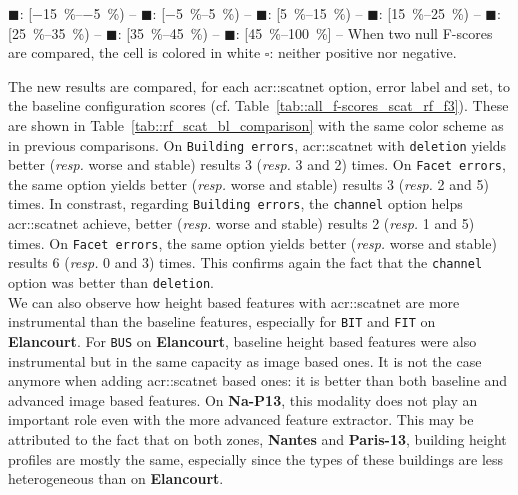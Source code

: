 \begin{table}[htbp]
{                    \textcolor{LOSS0515}{\(\blacksquare\)}: [\SIrange[range-phrase={, }]{-15}{-5}{\percent}) --
                    \textcolor{STBL}{\(\blacksquare\)}: [\SIrange[range-phrase={, }]{-5}{5}{\percent}) --
                    \textcolor{GAIN0515}{\(\blacksquare\)}: [\SIrange[range-phrase={, }]{5}{15}{\percent}) --
                    \textcolor{GAIN1525}{\(\blacksquare\)}: [\SIrange[range-phrase={, }]{15}{25}{\percent}) --
                    \textcolor{GAIN2535}{\(\blacksquare\)}: [\SIrange[range-phrase={, }]{25}{35}{\percent}) --
                    \textcolor{GAIN3545}{\(\blacksquare\)}: [\SIrange[range-phrase={, }]{35}{45}{\percent}) --
                    \textcolor{GAIN45}{\(\blacksquare\)}: [\SIrange[range-phrase={, }]{45}{100}{\percent}] --
                    When two null F-scores are compared, the cell is colored in white \(\square\): neither positive nor negative.
                }
            \end{table}

            The new results are compared, for each \gls{acr::scatnet} option, error label and set, to the baseline configuration scores (cf. Table~\ref{tab::all_f-scores_scat_rf_f3}).
            These are shown in Table~\ref{tab::rf_scat_bl_comparison} with the same color scheme as in previous comparisons.
            On \texttt{Building errors}, \gls{acr::scatnet} with \texttt{deletion} yields better (\textit{resp.} worse and stable) results 3 (\textit{resp.} 3 and 2) times.
            On \texttt{Facet errors}, the same option yields better (\textit{resp.} worse and stable) results 3 (\textit{resp.} 2 and 5) times.
            In constrast, regarding \texttt{Building errors}, the \texttt{channel} option helps \gls{acr::scatnet} achieve, better (\textit{resp.} worse and stable) results 2 (\textit{resp.} 1 and 5) times.
            On \texttt{Facet errors}, the same option yields better (\textit{resp.} worse and stable) results 6 (\textit{resp.} 0 and 3) times.
            This confirms again the fact that the \texttt{channel} option was better than \texttt{deletion}.\\

            We can also observe how height based features with \gls{acr::scatnet} are more instrumental than the baseline features, especially for \texttt{BIT} and \texttt{FIT} on \textbf{Elancourt}.
            For \texttt{BUS} on \textbf{Elancourt}, baseline height based features were also instrumental but in the same capacity as image based ones.
            It is not the case anymore when adding \gls{acr::scatnet} based ones: it is better than both baseline and advanced image based features.
            On \textbf{Na-P13}, this modality does not play an important role even with the more advanced feature extractor.
            This may be attributed to the fact that on both zones, \textbf{Nantes} and \textbf{Paris-13}, building height profiles are mostly the same, especially since the types of these buildings are less heterogeneous than on \textbf{Elancourt}.\\

